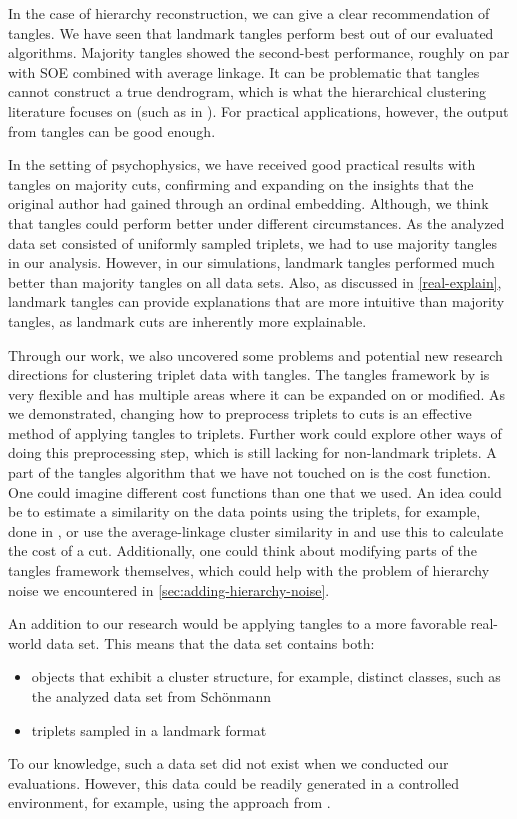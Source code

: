 In the case of hierarchy reconstruction, we can give a clear recommendation of tangles. We have seen that landmark tangles perform best out of our evaluated algorithms. Majority tangles 
showed the second-best performance, roughly on par with SOE combined with average linkage. 
It can be problematic that tangles cannot construct a true dendrogram, which is what the hierarchical clustering literature focuses on (such as in \cite{ghoshdastidarFoundationsComparisonBasedHierarchical2019}).  For practical applications, however, the output from tangles can be good enough. 

In the setting of psychophysics, we have received good practical results with tangles on majority cuts,
confirming and expanding on the insights that the original author had gained through an ordinal embedding. 
Although, we think that tangles could perform better under different circumstances.
As the analyzed data set consisted of uniformly sampled triplets, we had to use majority tangles in our analysis.
However, in our simulations, landmark tangles performed much better than majority tangles on all data sets.
Also, as discussed in \autoref{real-explain}, landmark tangles can provide explanations that are more intuitive than majority tangles, as landmark cuts are inherently more explainable. 

Through our work, we also uncovered some problems and potential new research directions for clustering triplet data with tangles. 
The tangles framework by \cite{klepperClusteringTanglesAlgorithmic2021} is very flexible and has multiple areas where it can be expanded on or modified. 
As we demonstrated, changing how to preprocess triplets to cuts is an effective method of applying tangles to triplets. 
Further work could explore other ways of doing this preprocessing step, which is still lacking for non-landmark triplets. 
A part of the tangles algorithm that we have not touched on is the cost function. 
One could imagine different cost functions than one that we used. An idea could be to estimate a similarity on the data points using the triplets, for example, done in 
\cite{kleindessnerKernelFunctionsBased2017}, or use the average-linkage cluster similarity in \cite{ghoshdastidarFoundationsComparisonBasedHierarchical2019} and use this to calculate the cost 
of a cut.
Additionally, one could think about modifying parts of the tangles framework themselves, which could help with the problem of 
hierarchy noise we encountered in \autoref{sec:adding-hierarchy-noise}.

An addition to our research would be applying tangles to a more favorable real-world data set. This means that the data set contains both:
\begin{itemize}
    \item objects that exhibit a cluster structure, for example, distinct classes, such as the analyzed data set from Schönmann
    \item triplets sampled in a landmark format
\end{itemize}
To our knowledge, such a data set did not exist when we conducted our evaluations. However, this data could be readily generated in a controlled environment, 
for example, using the approach from \cite{inesschonmannSimilarityJudgementsNatural2021}.
